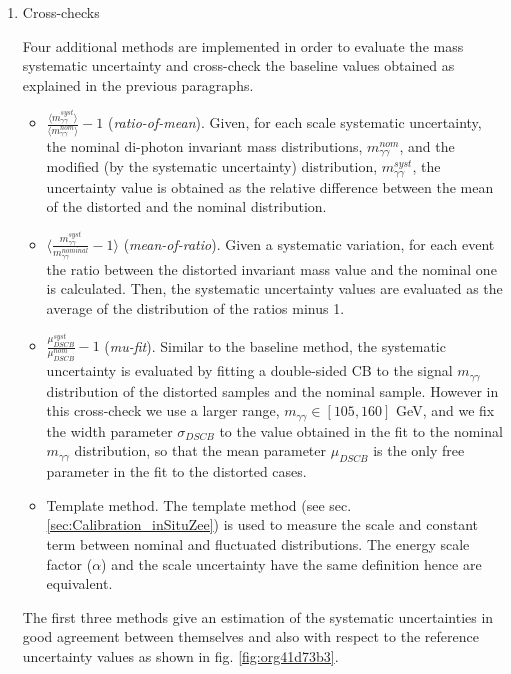 \begin{enumerate}
\item Cross-checks
\label{sec:org44c935f}

Four additional methods are implemented in order to evaluate the mass systematic uncertainty and cross-check the baseline values obtained as explained in the previous paragraphs.


\begin{itemize}
\item \(\frac{\langle m_{\gamma\gamma}^{syst}\rangle}{\langle m_{\gamma\gamma}^{nom}\rangle}-1\) (\textit{ratio-of-mean}). Given, for each scale systematic uncertainty, the nominal di-photon invariant mass distributions, \(m_{\gamma\gamma}^{nom}\), and the modified (by the systematic uncertainty) distribution, \(m_{\gamma\gamma}^{syst}\),  the uncertainty value is obtained as the relative difference between the mean of the distorted and the nominal distribution.
\item \(\langle\frac{m_{\gamma\gamma}^{syst}}{m_{\gamma\gamma}^{nominal}}-1\rangle\) (\textit{mean-of-ratio}). Given a systematic variation, for each event the ratio between the distorted invariant mass value and the nominal one is calculated. Then, the systematic uncertainty values are evaluated as the average of the distribution of the ratios minus 1.
\item \(\frac{ \mu_{DSCB}^{syst}}{\mu_{DSCB}^{nom}}-1\) (\textit{mu-fit}). Similar to the baseline method, the systematic uncertainty is evaluated by fitting a double-sided CB to the signal \(m_{\gamma\gamma}\) distribution of the distorted samples and the nominal sample. However in this cross-check we use a larger range, $m_{\gamma\gamma} \in [105,160]$ GeV, and we fix the width parameter \(\sigma_{DSCB}\) to the value obtained in the fit to the nominal \(m_{\gamma\gamma}\) distribution, so that the mean parameter \(\mu_{DSCB}\) is the only free parameter in the fit to the distorted cases.
\item Template method. The template method (see sec. \ref{sec:Calibration_inSituZee}) is used to measure the scale and constant term between nominal and fluctuated distributions.
The energy scale factor ($\alpha$) and the scale uncertainty have the same definition hence are equivalent.
\end{itemize}


The first three methods give an estimation of the systematic uncertainties in good agreement between themselves and also with respect to the reference uncertainty values as shown in fig. \ref{fig:org41d73b3}.


\end{enumerate}
